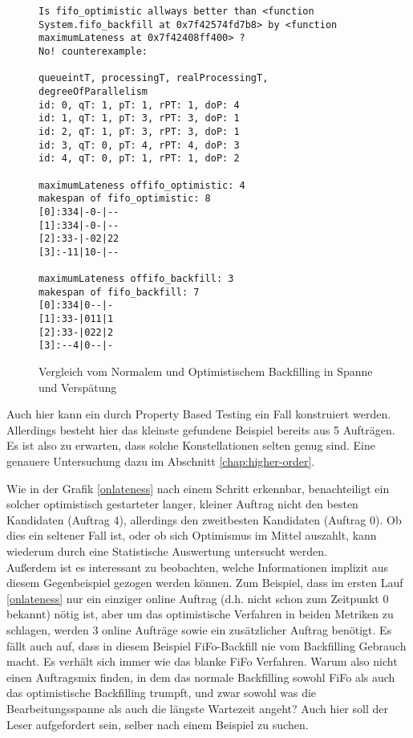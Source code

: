 \begin{figure}
\centering
\begin{verbatim}
Is fifo_optimistic allways better than <function System.fifo_backfill at 0x7f42574fd7b8> by <function maximumLateness at 0x7f42408ff400> ?
No! counterexample:

queueintT, processingT, realProcessingT, degreeOfParallelism
id: 0, qT: 1, pT: 1, rPT: 1, doP: 4
id: 1, qT: 1, pT: 3, rPT: 3, doP: 1
id: 2, qT: 1, pT: 3, rPT: 3, doP: 1
id: 3, qT: 0, pT: 4, rPT: 4, doP: 3
id: 4, qT: 0, pT: 1, rPT: 1, doP: 2

maximumLateness offifo_optimistic: 4
makespan of fifo_optimistic: 8
[0]:334|-0-|--
[1]:334|-0-|--
[2]:33-|-02|22
[3]:-11|10-|--

maximumLateness offifo_backfill: 3
makespan of fifo_backfill: 7
[0]:334|0--|-
[1]:33-|011|1
[2]:33-|022|2
[3]:--4|0--|-
\end{verbatim}
\caption{Vergleich vom Normalem und Optimistischem Backfilling in Spanne und Verspätung}
\label{onlatenessmakespan}
\end{figure}

Auch hier kann ein durch Property Based Testing ein Fall konstruiert werden. Allerdings besteht hier das kleinste gefundene Beispiel bereits aus 5 Aufträgen. Es ist also zu erwarten, dass solche Konstellationen selten genug sind. Eine genauere Untersuchung dazu im Abschnitt \ref{chap:higher-order}.
\FloatBarrier

Wie in der Grafik \ref{onlateness} nach einem Schritt erkennbar, benachteiligt ein solcher optimistisch gestarteter langer, kleiner Auftrag nicht den besten Kandidaten (Auftrag 4), allerdings den zweitbesten Kandidaten (Auftrag 0). Ob dies ein seltener Fall ist, oder ob sich Optimismus im Mittel auszahlt, kann wiederum durch eine Statistische Auswertung untersucht werden.\\

Außerdem ist es interessant zu beobachten, welche Informationen implizit aus diesem Gegenbeispiel gezogen werden können. Zum Beispiel, dass im ersten Lauf \ref{onlateness} nur ein einziger online Auftrag (d.h. nicht schon zum Zeitpunkt 0 bekannt) nötig ist, aber um das optimistische Verfahren in beiden Metriken zu schlagen, werden 3 online Aufträge sowie ein zusätzlicher Auftrag benötigt. Es fällt auch auf, dass in diesem Beispiel FiFo-Backfill nie vom Backfilling Gebrauch macht. Es verhält sich immer wie das blanke FiFo Verfahren. Warum also nicht einen Auftragsmix finden, in dem das normale Backfilling sowohl FiFo als auch das optimistische Backfilling trumpft, und zwar sowohl was die Bearbeitungsspanne als auch die längste Wartezeit angeht? Auch hier soll der Leser aufgefordert sein, selber nach einem Beispiel zu suchen.\\

